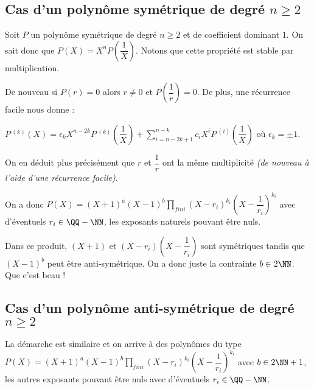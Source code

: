 \subsection*{Cas d'un polynôme symétrique de degré $n \geqslant 2$}

Soit $P$ un polynôme symétrique de degré $n \geqslant 2$ et de coefficient dominant $1$. On sait donc que $P(X) = X^n P\left( \dfrac1X \right)$. Notons que cette propriété est stable par multiplication. 

\medskip

De nouveau si $P(r) = 0$ alors $r \neq 0$ et $P\left( \dfrac1r \right) = 0$.
De plus, une récurrence facile nous donne :

\medskip

$\displaystyle
  P\,^{(k)}(X) 
=
  \epsilon_k X^{n - 2k} P\,^{(k)}\left( \dfrac1X \right)
+
  \sum_{i = n - 2k + 1}^{n - k} c_i X^i P\,^{(i)}\left( \dfrac1X \right)$
où $\epsilon_k = \pm 1$.


\medskip

On en déduit plus précisément que $r$ et $\dfrac1r$ ont la même multiplicité \emph{(de nouveau à l'aide d'une récurrence facile)}.


\medskip

On a donc
$\displaystyle P(X) = (X + 1)^a (X - 1)^b \prod_{fini} (X - r_i)^{k_i} \left( X - \dfrac1{r_i} \right)^{k_i}$ avec d'éventuels $r_i \in \QQ - \NN$, les exposants naturels pouvant être nuls.


\medskip

Dans ce produit, $(X + 1)$ et $(X - r_i) \left( X - \dfrac1{r_i} \right)$ sont symétriques tandis que $(X - 1)^b$ peut être anti-symétrique.
On a donc juste la contrainte $b \in 2 \NN$. Que c'est beau !


\subsection*{Cas d'un polynôme anti-symétrique de degré $n \geqslant 2$}

La démarche est similaire et on arrive à des polynômes du type
$\displaystyle P(X) = (X + 1)^a (X - 1)^b \prod_{fini} (X - r_i)^{k_i} \left( X - \dfrac1{r_i} \right)^{k_i}$
avec $b \in 2 \NN + 1$, les autres exposants pouvant être nuls avec d'éventuels $r_i \in \QQ - \NN$.




